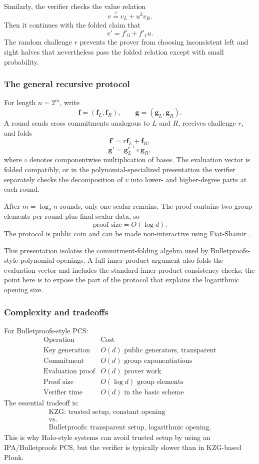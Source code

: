 Similarly, the verifier checks the value relation
\[
    v\stackrel{?}{=}v_L+u^2v_R.
\]
Then it continues with the folded claim that
\[
    v'=f'_0+f'_1u.
\]
The random challenge $r$ prevents the prover from choosing inconsistent left and right halves that nevertheless pass the folded relation except with small probability.

\subsubsection{The general recursive protocol}

For length $n=2^m$, write
\[
    \mathbf f=(\mathbf f_L,\mathbf f_R),
    \qquad
    \mathbf g=(\mathbf g_L,\mathbf g_R).
\]
A round sends cross commitments analogous to $L$ and $R$, receives challenge $r$, and folds
\[
    \mathbf f' = r\mathbf f_L+\mathbf f_R,
\]
\[
    \mathbf g' = \mathbf g_L^{r^{-1}}\circ \mathbf g_R,
\]
where $\circ$ denotes componentwise multiplication of bases. The evaluation vector is folded compatibly, or in the polynomial-specialized presentation the verifier separately checks the decomposition of $v$ into lower- and higher-degree parts at each round.

After $m=\log_2 n$ rounds, only one scalar remains. The proof contains two group elements per round plus final scalar data, so
\[
    \text{proof size}=O(\log d).
\]
The protocol is public coin and can be made non-interactive using Fiat-Shamir \cite{FiatShamir1986}.

This presentation isolates the commitment-folding algebra used by Bulletproofs-style polynomial openings. A full inner-product argument also folds the evaluation vector and includes the standard inner-product consistency checks; the point here is to expose the part of the protocol that explains the logarithmic opening size.

\subsubsection{Complexity and tradeoffs}

For Bulletproofs-style PCS:
\[
\begin{array}{c|c}
\text{Operation} & \text{Cost}\\
\hline
\text{Key generation} & O(d)\text{ public generators, transparent}\\
\text{Commitment} & O(d)\text{ group exponentiations}\\
\text{Evaluation proof} & O(d)\text{ prover work}\\
\text{Proof size} & O(\log d)\text{ group elements}\\
\text{Verifier time} & O(d)\text{ in the basic scheme}
\end{array}
\]
The essential tradeoff is:
\[
\begin{array}{c}
\text{KZG: trusted setup, constant opening}\\[0.2em]
\text{vs.}\\[0.2em]
\text{Bulletproofs: transparent setup, logarithmic opening}.
\end{array}
\]
This is why Halo-style systems can avoid trusted setup by using an IPA/Bulletproofs PCS, but the verifier is typically slower than in KZG-based Plonk.

